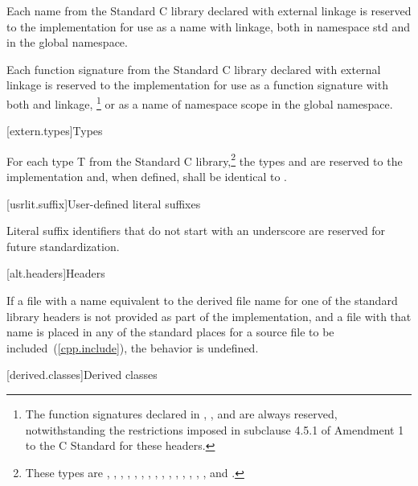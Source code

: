 \pnum
Each name from the Standard C library declared with external linkage
%
is reserved to the implementation for use as a name with
%
%
linkage,
both in namespace std and in the global namespace.

\pnum
Each function signature from the Standard C library declared with
%
external linkage
is reserved to the implementation for use as
a function signature with both
%
and
%
linkage,
\footnote{
The function
signatures declared in
%
%
%
%
%
%
, 
,
and
are always reserved, notwithstanding the restrictions imposed in subclause
4.5.1 of Amendment 1 to the C Standard for these headers.}
or as a name of namespace scope in the global namespace.

[extern.types]{Types}

\pnum
For each type T from the Standard C library,\footnote{These types are
,
,
,
,
,
,
,
,
,
,
,
,
,
,
,
and
.}
the types
and
are reserved to the implementation and, when defined,
shall be identical to
.

[usrlit.suffix]{User-defined literal suffixes}

\pnum
Literal suffix identifiers that do not start with an underscore are reserved for future standardization.

[alt.headers]{Headers}

\pnum
If a file with a name
%
equivalent to the derived file name for one of the \Cpp standard library headers
is not provided as part of the implementation, and a file with that name
is placed in any of the standard places for a source file to be included~(\ref{cpp.include}),
the behavior is undefined.%
%

[derived.classes]{Derived classes}

